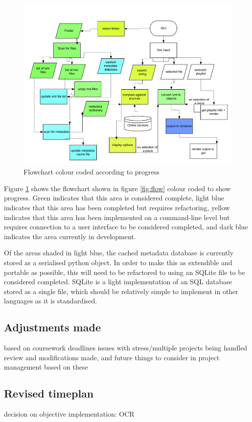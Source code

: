 \begin{figure}[h]
    \centering
    \includegraphics[width=400pt]{flowchart-progress}
    \caption{Flowchart colour coded according to progress}
    \label{colours}
\end{figure}
Figure \ref{colours} shows the flowchart shown in figure \ref{fig:flow} colour coded to show progress. Green indicates that this area is considered complete, light blue indicates that this area has been completed but requires refactoring, yellow indicates that this area has been implemented on a command-line level but requires connection to a user interface to be considered completed, and dark blue indicates the area currently in development.

Of the areas shaded in light blue, the cached metadata database is currently stored as a serialised python object. In order to make this as extendible and portable as possible, this will need to be refactored to using an SQLite file to be considered completed. SQLite is a light implementation of an SQL database stored as a single file, which should be relatively simple to implement in other languages as it is standardised.
\subsection{Adjustments made}
based on coursework deadlines
issues with stress/multiple projects being handled
review and modifications made, and future things to consider in project management based on these

\subsection{Revised timeplan}
decision on objective implementation: OCR